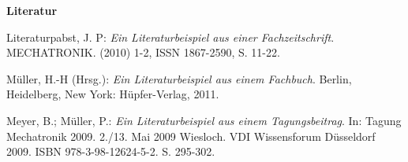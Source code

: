 \documentclass[fleqn,a4paper,10pt]{article}
\begin{document}
\vspace{18pt} 

\begingroup\Large{\textbf{Literatur}}\endgroup
\begingroup %
\renewcommand{\section}[1]{} %
\begin{thebibliography}{99}
Literaturpabst, J. P:
\newblock \textit{Ein Literaturbeispiel aus einer Fachzeitschrift}.
\newblock MECHATRONIK. (2010) 1-2, ISSN 1867-2590, S. 11-22.

Müller, H.-H (Hrsg.):
\newblock \textit{Ein Literaturbeispiel aus einem Fachbuch}.
\newblock Berlin, Heidelberg, New York: Hüpfer-Verlag, 2011.

Meyer, B.; Müller, P.:
\newblock \textit{Ein Literaturbeispiel aus einem Tagungsbeitrag}.
\newblock In: Tagung Mechatronik 2009. 2./13. Mai 2009 Wiesloch. VDI Wissensforum Düsseldorf 2009. ISBN 978-3-98-12624-5-2. S. 295-302. 

\end{thebibliography}
\endgroup %

\clearpage  %
\end{document}

